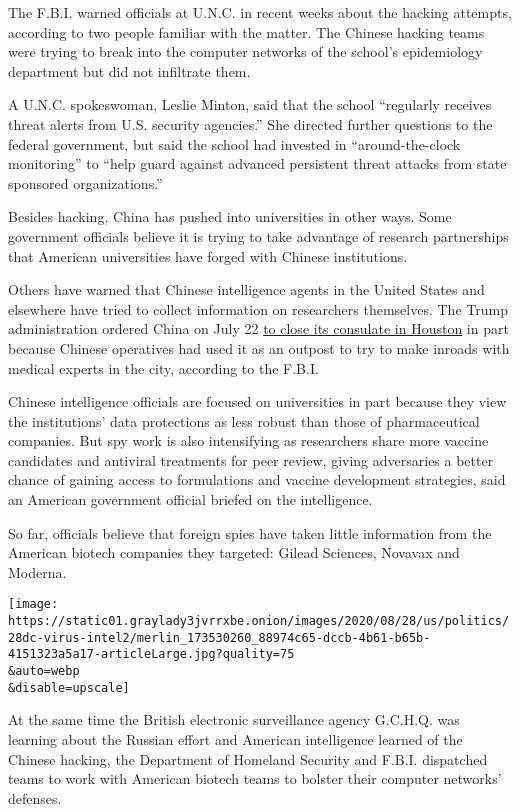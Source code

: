 The F.B.I. warned officials at U.N.C. in recent weeks about the hacking
attempts, according to two people familiar with the matter. The Chinese
hacking teams were trying to break into the computer networks of the
school's epidemiology department but did not infiltrate them.

A U.N.C. spokeswoman, Leslie Minton, said that the school ``regularly
receives threat alerts from U.S. security agencies.'' She directed
further questions to the federal government, but said the school had
invested in ``around-the-clock monitoring'' to ``help guard against
advanced persistent threat attacks from state sponsored organizations.''

Besides hacking, China has pushed into universities in other ways. Some
government officials believe it is trying to take advantage of research
partnerships that American universities have forged with Chinese
institutions.

Others have warned that Chinese intelligence agents in the United States
and elsewhere have tried to collect information on researchers
themselves. The Trump administration ordered China on July 22
\href{https://www.nytimes3xbfgragh.onion/2020/07/22/world/asia/us-china-houston-consulate.html}{to
close its consulate in Houston} in part because Chinese operatives had
used it as an outpost to try to make inroads with medical experts in the
city, according to the F.B.I.

Chinese intelligence officials are focused on universities in part
because they view the institutions' data protections as less robust than
those of pharmaceutical companies. But spy work is also intensifying as
researchers share more vaccine candidates and antiviral treatments for
peer review, giving adversaries a better chance of gaining access to
formulations and vaccine development strategies, said an American
government official briefed on the intelligence.

So far, officials believe that foreign spies have taken little
information from the American biotech companies they targeted: Gilead
Sciences, Novavax and Moderna.

\texttt{[image: https://static01.graylady3jvrrxbe.onion/images/2020/08/28/us/politics/28dc-virus-intel2/merlin\_173530260\_88974c65-dccb-4b61-b65b-4151323a5a17-articleLarge.jpg?quality=75\\\&auto=webp\\\&disable=upscale]}

At the same time the British electronic surveillance agency G.C.H.Q. was
learning about the Russian effort and American intelligence learned of
the Chinese hacking, the Department of Homeland Security and F.B.I.
dispatched teams to work with American biotech teams to bolster their
computer networks' defenses.

